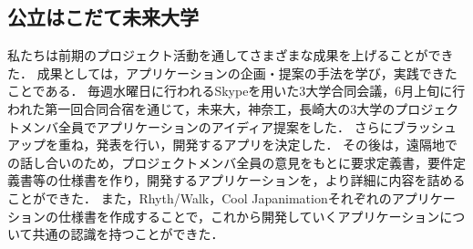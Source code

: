 \subsection{公立はこだて未来大学}
\par
私たちは前期のプロジェクト活動を通してさまざまな成果を上げることができた．
成果としては，アプリケーションの企画・提案の手法を学び，実践できたことである．
毎週水曜日に行われるSkypeを用いた3大学合同会議，6月上旬に行われた第一回合同合宿を通じて，未来大，神奈工，長崎大の3大学のプロジェクトメンバ全員でアプリケーションのアイディア提案をした．
さらにブラッシュアップを重ね，発表を行い，開発するアプリを決定した．
その後は，遠隔地での話し合いのため，プロジェクトメンバ全員の意見をもとに要求定義書，要件定義書等の仕様書を作り，開発するアプリケーションを，より詳細に内容を詰めることができた．
また，Rhyth/Walk，Cool Japanimationそれぞれのアプリケーションの仕様書を作成することで，これから開発していくアプリケーションについて共通の認識を持つことができた．
